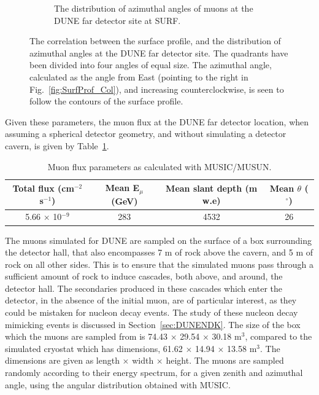 \begin{figure}
\begin{subfigure}{0.45\textwidth}
    \caption{The distribution of azimuthal angles of muons at the DUNE far detector site at SURF.}
    \label{fig:SurfProf_Azi}
  \end{subfigure}
  \caption[The correlation between the surface profile, and the distribution of azimuthal angles at the DUNE far detector site]
          {The correlation between the surface profile, and the distribution of azimuthal angles at the DUNE far detector site. The quadrants have been divided into four angles of equal size. The azimuthal angle, calculated as the angle from East (pointing to the right in Fig.~\ref{fig:SurfProf_Col}), and increasing counterclockwise, is seen to follow the contours of the surface profile.}
\end{figure}

Given these parameters, the muon flux at the DUNE far detector location, when assuming a spherical detector geometry, and without simulating a detector cavern, is given by Table~\ref{tab:MUSUNflux}. \\
\begin{table}
  \caption[Muon flux parameters as calculated with MUSIC/MUSUN.]
          {Muon flux parameters as calculated with MUSIC/MUSUN.}
  \centering
  \label{tab:MUSUNflux}
  \begin{tabular}{c c c c}
    \toprule
        {Total flux (cm$^{-2}$ s$^{-1}$)} & {Mean E$_{\mu}$ (GeV)} & {Mean slant depth (m w.e)} & {Mean $\theta$ ($^{\circ}$)} \\ 
        \midrule
        5.66 $\times$ 10$^{-9}$           & 283                    & 4532                       & 26                           \\
    \bottomrule
  \end{tabular}
\end{table}

The muons simulated for DUNE are sampled on the surface of a box surrounding the detector hall, that also encompasses 7 m of rock above the cavern, and 5 m of rock on all other sides. This is to ensure that the simulated muons pass through a sufficient amount of rock to induce cascades, both above, and around, the detector hall. The secondaries produced in these cascades which enter the detector, in the absence of the initial muon, are of particular interest, as they could be mistaken for nucleon decay events. The study of these nucleon decay mimicking events is discussed in Section~\ref{sec:DUNENDK}. The size of the box which the muons are sampled from is 74.43 $\times$ 29.54 $\times$ 30.18 m$^3$, compared to the simulated cryostat which has dimensions, 61.62 $\times$ 14.94 $\times$ 13.58 m$^3$. The dimensions are given as length $\times$ width $\times$ height. The muons are sampled randomly according to their energy spectrum, for a given zenith and azimuthal angle, using the angular distribution obtained with MUSIC. \\

